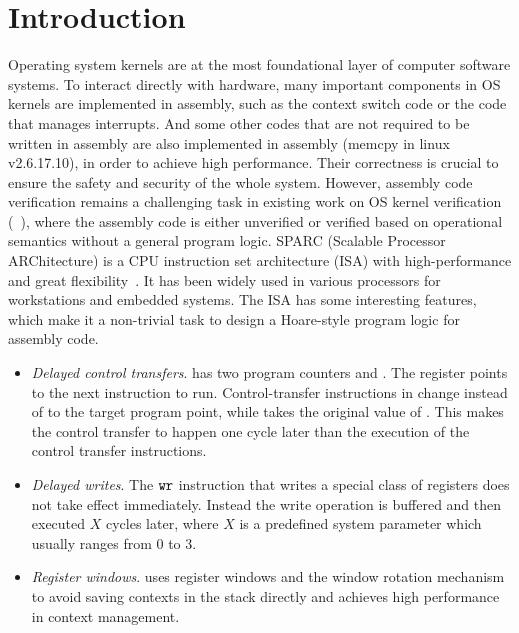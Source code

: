 \section{Introduction}

Operating system kernels are at
the most foundational layer of computer software systems.
To interact directly with hardware,
many important components in OS kernels are implemented
in assembly, such as the context switch code or the code that
manages interrupts. 
And some other codes that are not required to
be written in assembly are also implemented in assembly
(\eg \textsf{memcpy} in linux v2.6.17.10), 
in order to achieve high performance.   
Their correctness is crucial to ensure
the safety and security of the whole system.
However, assembly code verification remains a challenging
task in existing work on OS kernel verification
(\eg~\cite{Xu16cav, sel4, deepspec}),
where the assembly code is either unverified or verified based on
operational semantics without a general program logic.
SPARC (Scalable Processor ARChitecture)
is a CPU instruction set architecture (ISA) with high-performance
and great flexibility~\cite{sparc}.
It has been widely used in various processors
for workstations and embedded systems. %
The \sparc{} ISA has some interesting features, which
make it a non-trivial task to design a Hoare-style
program logic for assembly code.

\begin{itemize}
	\item \textit{Delayed control transfers}.
	\sparc{} has two program counters \pc{} and \npc.
    The \npc{} register points to the next instruction
    to run.
	Control-transfer instructions in \sparc{}
	change \npc{} instead of \pc{} to the target program point,
    while \pc{} takes the original value of \npc.
	This makes the control transfer to happen one cycle later
    than the execution of the control transfer instructions.
	
	\item \textit{Delayed writes}.
	The $\texttt{wr}$ instruction that writes a special class
    of registers
    does not take effect immediately.
    Instead the write operation is buffered
    and then executed $X$ cycles later, where $X$ is a
    predefined
    system parameter which usually ranges from 0 to 3.
	\item \textit{Register windows}.
	\sparc{} uses register windows
	and the window rotation mechanism
	to avoid saving contexts in the stack directly
	and achieves high performance in context management.
\end{itemize}

